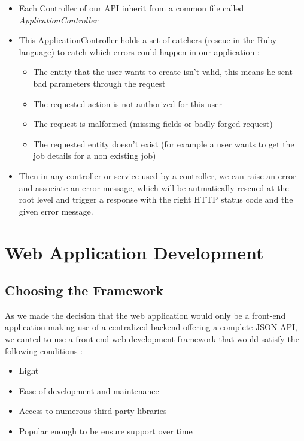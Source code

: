 \documentclass{eplmastersthesis}
\begin{document}
          \begin{itemize}
            \item Each Controller of our API inherit from a common file
            called \textit{ApplicationController}
            \item This ApplicationController holds a set of catchers (rescue
            in the Ruby language) to catch which errors could happen in our
            application :
              \begin{itemize}
                \item The entity that the user wants to create isn't valid, this
                means he sent bad parameters through the request
                \item The requested action is not authorized for this user
                \item The request is malformed (missing fields or badly forged
                request)
                \item The requested entity doesn't exist (for example a user
                wants to get the job details for a non existing job)
              \end{itemize}
            \item Then in any controller or service used by a controller, we
            can raise an error and associate an error message, which will be
            autmatically rescued at the root level and trigger a response with
            the right HTTP status code and the given error message.
          \end{itemize}

    \section{Web Application Development}

      \subsection{Choosing the Framework}

        As we made the decision that the web application would only be a
        front-end application making use of a centralized backend offering
        a complete JSON API, we canted to use a front-end web development
        framework that would satisfy the following conditions : \\

        \begin{itemize}
          \item Light
          \item Ease of development and maintenance
          \item Access to numerous third-party libraries
          \item Popular enough to be ensure support over time
        \end{itemize}
\end{document}
